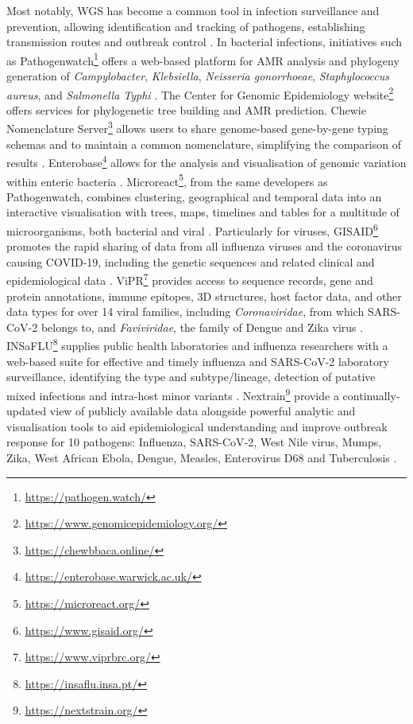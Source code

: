 Most notably, \ac{WGS} has become a common tool in infection surveillance and prevention, allowing identification and tracking of pathogens, establishing transmission routes and outbreak control \citep{lo_genomics_2020}. 
In bacterial infections, initiatives such as Pathogenwatch\footnote{\url{https://pathogen.watch/}} offers a web-based platform for \ac{AMR} analysis and phylogeny generation of \textit{Campylobacter}, \textit{Klebsiella}, \textit{Neisseria gonorrhoeae}, \textit{Staphylococcus aureus}, and \textit{Salmonella Typhi} \citep{afolayan_overcoming_2021}. 
The Center for Genomic Epidemiology website\footnote{\url{https://www.genomicepidemiology.org/}} offers services for phylogenetic tree building and \ac{AMR} prediction. 
Chewie Nomenclature Server\footnote{\url{https://chewbbaca.online/}} allows users to share genome-based gene-by-gene typing schemas and to maintain a common nomenclature, simplifying the comparison of results \citep{mamede_chewie_2021}. 
Enterobase\footnote{\url{https://enterobase.warwick.ac.uk/}} allows for the analysis and visualisation of genomic variation within enteric bacteria \citep{zhou_enterobase_2020}. 
Microreact\footnote{\url{https://microreact.org/}}, from the same developers as Pathogenwatch, combines clustering, geographical and temporal data into an interactive visualisation with trees, maps, timelines and tables for a multitude of microorganisms, both bacterial and viral \citep{argimon_microreact_nodate}. 
Particularly for viruses, GISAID\footnote{\url{https://www.gisaid.org/}}  promotes the rapid sharing of data from all influenza viruses and the coronavirus causing COVID-19, including the genetic sequences and related clinical and epidemiological data \citep{shu_gisaid_2017}. 
ViPR\footnote{\url{https://www.viprbrc.org/}} provides access to sequence records, gene and protein annotations, immune epitopes, 3D structures, host factor data, and other data types for over 14 viral families, including \textit{Coronaviridae}, from which \ac{SARS-CoV-2} belongs to, and \textit{Faviviridae}, the family of Dengue and Zika virus \citep{pickett_virus_2012}. 
INSaFLU\footnote{\url{https://insaflu.insa.pt/}} supplies public health laboratories and influenza researchers with a web-based suite for effective and timely influenza and \ac{SARS-CoV-2} laboratory surveillance, identifying the type and subtype/lineage, detection of putative mixed infections and intra-host minor variants \citep{borges_insaflu_2018}. Nextrain\footnote{\url{https://nextstrain.org/}} provide a continually-updated view of publicly available data alongside powerful analytic and visualisation tools to aid epidemiological understanding and improve outbreak response for 10 pathogens: Influenza, SARS-CoV-2, West Nile virus, Mumps, Zika, West African Ebola, Dengue, Measles, Enterovirus D68 and Tuberculosis \citep{hadfield_nextstrain_2018}.

